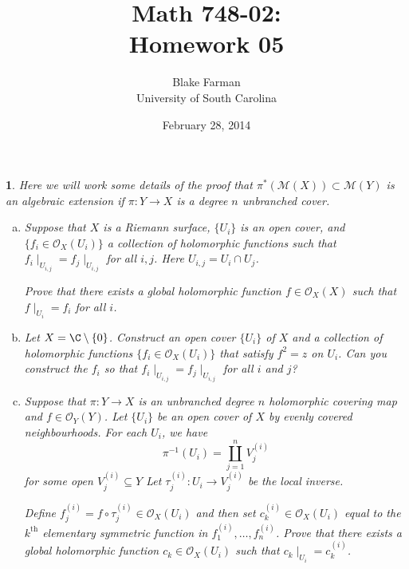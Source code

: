 \documentclass[10pt]{amsart}
\author{Blake Farman\\University of South Carolina}
\title{Math 748-02:\\Homework 05}
\date{February 28, 2014}
\begin{document}
\maketitle

\providecommand{\p}{\mathfrak{p}}
\providecommand{\m}{\mathfrak{m}}
\providecommand{\Deck}[1]{\operatorname{Deck}\left(#1\right)}

\newtheorem{thm}{}
\newtheorem{lem}{Lemma}
\newtheorem{prop}{Proposition}
\theoremstyle{definition}
\newtheorem{defn}{Definition}[thm]

\newcommand{\A}{\mathbb{A}}

\begin{thm}
  Here we will work some details of the proof that $\pi^*\left(\mathcal{M}(X)\right) \subset \mathcal{M}\left(Y\right)$ is an algebraic extension if $\pi \colon Y \rightarrow X$ is a degree $n$ unbranched cover.
  
  \begin{enumerate}[(a)]
  \item
    Suppose that $X$ is a Riemann surface, $\{U_i\}$ is an open cover, and $\{f_i \in \mathcal{O}_X(U_i)\}$ a collection of holomorphic functions such that $f_i\mid_{U_{i,j}} = f_j \mid_{U_{i,j}}$ for all $i,j$.
    Here $U_{i,j} = U_i \cap U_j$.
    
    Prove that there exists a global holomorphic function $f \in \mathcal{O}_X(X)$ such that $f \mid_{U_i} = f_i$ for all $i$.
  \item
    Let $X = \C \setminus \{0\}$.
    Construct an open cover $\{U_i\}$ of $X$ and a collection of holomorphic functions $\{f_i \in \mathcal{O}_X(U_i)\}$ that satisfy $f^2 = z$ on $U_i$.
    Can you construct the $f_i$ so that $f_i\mid_{U_{i,j}} = f_j \mid_{U_{i,j}}$ for all $i$ and $j$?
  \item
    Suppose that $\pi \colon Y \rightarrow X$ is an unbranched degree $n$ holomorphic covering map and $f \in \mathcal{O}_Y(Y)$.
    Let $\{U_i\}$ be an open cover of $X$ by evenly covered neighbourhoods.
    For each $U_i$, we have
    $$\pi^{-1}(U_i) = \coprod_{j=1}^n V_j^{(i)}$$
    for some open $V_j^{(i)} \subseteq Y$
    Let $\tau_{j}^{(i)} \colon U_i \rightarrow V_j^{(i)}$ be the local inverse.
    
    Define $f_j^{(i)} = f \circ \tau_{j}^{(i)} \in \mathcal{O}_X(U_i)$ and then set $c_k^{(i)} \in \mathcal{O}_X(U_i)$ equal to the $k^\text{th}$ elementary symmetric function in $f_1^{(i)}, \ldots, f_n^{(i)}$.
    Prove that there exists a global holomorphic function $c_k \in \mathcal{O}_X(U_i)$ such that $c_k \mid_{U_i} = c_k^{(i)}$.
  \end{enumerate}
  

\end{thm}
\end{document}
